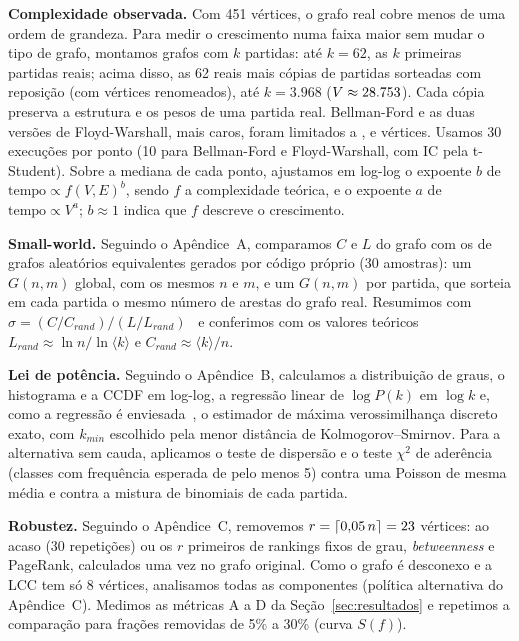 \documentclass[sigconf]{webmedia}
\begin{document}
\textbf{Complexidade observada.} Com 451 vértices, o grafo real cobre menos de uma ordem de grandeza. Para medir o crescimento numa faixa maior sem mudar o tipo de grafo, montamos grafos com $k$ partidas: até $k = 62$, as $k$ primeiras partidas reais; acima disso, as 62 reais mais cópias de partidas sorteadas com reposição (com vértices renomeados), até $k = 3.968$ ($V \approx 28.753$). Cada cópia preserva a estrutura e os pesos de uma partida real. Bellman-Ford e as duas versões de Floyd-Warshall, mais caros, foram limitados a \VmaxBF{}, \VmaxFW{} e \VmaxFWnumpy{} vértices. Usamos 30 execuções por ponto (10 para Bellman-Ford e Floyd-Warshall, com IC pela t-Student). Sobre a mediana de cada ponto, ajustamos em log-log o expoente $b$ de $\text{tempo} \propto f(V,E)^b$, sendo $f$ a complexidade teórica, e o expoente $a$ de $\text{tempo} \propto V^a$; $b \approx 1$ indica que $f$ descreve o crescimento.

\textbf{Small-world.} Seguindo o Apêndice~A, comparamos $C$ e $L$ do grafo com os de grafos aleatórios equivalentes gerados por código próprio (30 amostras): um $G(n,m)$ global, com os mesmos $n$ e $m$, e um $G(n,m)$ por partida, que sorteia em cada partida o mesmo número de arestas do grafo real. Resumimos com $\sigma = (C/C_{rand})/(L/L_{rand})$~\cite{humphries2008} e conferimos com os valores teóricos $L_{rand} \approx \ln n/\ln\langle k\rangle$ e $C_{rand} \approx \langle k\rangle/n$.

\textbf{Lei de potência.} Seguindo o Apêndice~B, calculamos a distribuição de graus, o histograma e a CCDF em log-log, a regressão linear de $\log P(k)$ em $\log k$ e, como a regressão é enviesada~\cite{clauset2009}, o estimador de máxima verossimilhança discreto exato, com $k_{min}$ escolhido pela menor distância de Kolmogorov--Smirnov. Para a alternativa sem cauda, aplicamos o teste de dispersão e o teste $\chi^2$ de aderência (classes com frequência esperada de pelo menos 5) contra uma Poisson de mesma média e contra a mistura de binomiais de cada partida.

\textbf{Robustez.} Seguindo o Apêndice~C, removemos $r = \lceil 0{,}05\,n \rceil = 23$ vértices: ao acaso (30 repetições) ou os $r$ primeiros de rankings fixos de grau, \textit{betweenness} e PageRank, calculados uma vez no grafo original. Como o grafo é desconexo e a LCC tem só 8 vértices, analisamos todas as componentes (política alternativa do Apêndice~C). Medimos as métricas A a D da Seção~\ref{sec:resultados} e repetimos a comparação para frações removidas de 5\% a 30\% (curva $S(f)$).
\end{document}
